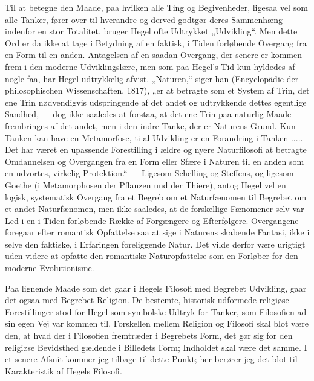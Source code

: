\documentclass[12pt,a4paper,openany]{book}
\newcommand{\opage}[1]{\marginnote{\footnotesize\textit{[#1]}}}
\begin{document}
Til at betegne den Maade, paa hvilken alle Ting og Begivenheder,
ligesaa vel som alle Tanker, fører over til hverandre og derved godtgør
deres Sammenhæng indenfor en stor Totalitet, bruger Hegel ofte
Udtrykket „Udvikling“. Men dette Ord er da ikke at tage i Betydning
af en faktisk, i Tiden forløbende Overgang fra en Form til en
anden. Antagelsen af en saadan Overgang, der senere er kommen
frem i den moderne Udviklingslære, men som paa Hegel’s Tid kun
hyldedes af nogle faa, har Hegel udtrykkelig afvist. „Naturen,“ siger
han (Encyclopädie der philosophischen Wissenschaften. 1817), „er at
betragte som et System af Trin, det ene Trin nødvendigvis udspringende
af det andet og udtrykkende dettes egentlige Sandhed, --- dog
ikke saaledes at forstaa, at det ene Trin paa naturlig Maade frembringes
af det andet, men i den indre Tanke, der er Naturens Grund.
Kun Tanken kan have en Metamorfose, ti al Udvikling er en Forandring
i Tanken ..... Det har været en upassende Forestilling i
ældre og nyere Naturfilosofi at betragte Omdannelsen og Overgangen
fra en Form eller Sfære i Naturen til en anden som en udvortes,
virkelig Protektion.“ --- Ligesom Schelling og Steffens, og ligesom
Goethe (i Metamorphosen der Pflanzen und der Thiere), antog Hegel
\opage{12}vel en logisk, systematisk Overgang fra et Begreb om et Naturfænomen
til Begrebet om et andet Naturfænomen, men ikke saaledes, at
de forskellige Fænomener selv var Led i en i Tiden forløbende Række
af Forgængere og Efterfølgere. Overgangene foregaar efter romantisk
Opfattelse saa at sige i Naturens skabende Fantasi, ikke i selve
den faktiske, i Erfaringen foreliggende Natur. Det vilde derfor være
urigtigt uden videre at opfatte den romantiske Naturopfattelse som
en Forløber for den moderne Evolutionisme.

Paa lignende Maade som det gaar i Hegels Filosofi med Begrebet
Udvikling, gaar det ogsaa med Begrebet Religion. De bestemte, historisk
udformede religiøse Forestillinger stod for Hegel som symbolske
Udtryk for Tanker, som Filosofien ad sin egen Vej var kommen
til. Forskellen mellem Religion og Filosofi skal blot være den,
at hvad der i Filosofien fremtræder i Begrebets Form, det gør sig
for den religiøse Bevidsthed gældende i Billedets Form; Indholdet
skal være det samme. I et senere Afsnit kommer jeg tilbage til dette
Punkt; her berører jeg det blot til Karakteristik af Hegels Filosofi.
\end{document}
